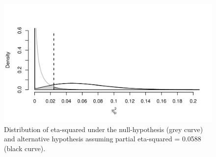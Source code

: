 \documentclass[,jou, draftfirst, a4paper,floatsintext]{apa6}
\begin{document}
\begin{figure}
\centering
\includegraphics{0.1_Simulation_Based_Power_Analysis_For_Factorial_ANOVA_Designs_files/figure-latex/eta-plot-1.pdf}
\caption{\label{fig:eta-plot}Distribution of eta-squared under the null-hypothesis (grey curve) and alternative hypothesis assuming partial eta-squared = 0.0588 (black curve).}
\end{figure}
\end{document}
